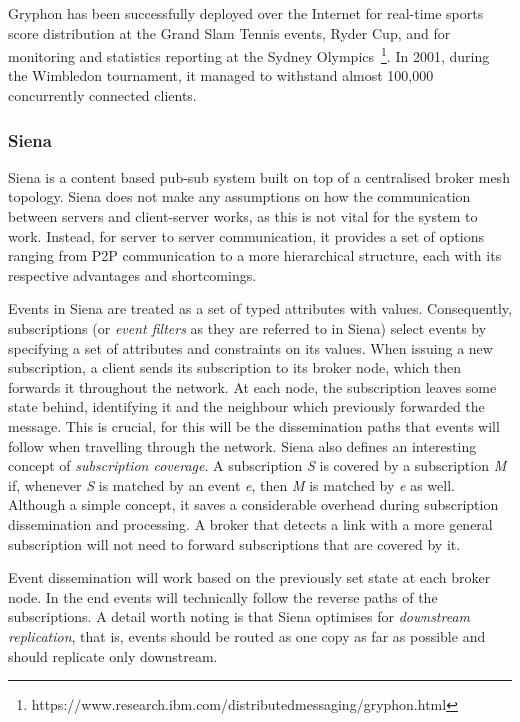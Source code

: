 Gryphon has been successfully deployed over the Internet for real-time
sports score distribution at the Grand Slam Tennis events, Ryder Cup,
and for monitoring and statistics reporting at the Sydney Olympics~\footnote{https://www.research.ibm.com/distributedmessaging/gryphon.html}.
In 2001, during the Wimbledon tournament, it managed to withstand almost
100,000 concurrently connected clients.

\subsubsection{Siena}\label{siena}

Siena \cite{Carzaniga2003} is a content based pub-sub system built
on top of a centralised broker mesh topology. Siena does not make any
assumptions on how the communication between servers and client-server
works, as this is not vital for the system to work. Instead, for server
to server communication, it provides a set of options ranging from P2P
communication to a more hierarchical structure, each with its respective
advantages and shortcomings.

Events in Siena are treated as a set of typed attributes with values.
Consequently, subscriptions (or \emph{event filters} as they are
referred to in Siena) select events by specifying a set of attributes
and constraints on its values. When issuing a new subscription, a client
sends its subscription to its broker node, which then forwards it
throughout the network. At each node, the subscription leaves some state
behind, identifying it and the neighbour which previously forwarded the
message. This is crucial, for this will be the dissemination paths that
events will follow when travelling through the network. Siena also
defines an interesting concept of \emph{subscription coverage}. A
subscription \emph{S} is covered by a subscription \emph{M} if, whenever
\emph{S} is matched by an event \emph{e}, then \emph{M} is matched by
\emph{e} as well. Although a simple concept, it saves a considerable
overhead during subscription dissemination and processing. A broker that
detects a link with a more general subscription will not need to forward
subscriptions that are covered by it.

Event dissemination will work based on the previously set state at each
broker node. In the end events will technically follow the reverse paths
of the subscriptions. A detail worth noting is that Siena optimises for
\emph{downstream replication}, that is, events should be routed as one
copy as far as possible and should replicate only downstream.


